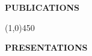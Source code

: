 \documentclass[9pt,letterpaper]{article}
\begin{document}
\newpage

\singlespacing

\noindent \textbf{PUBLICATIONS}
\begin{bibunit}[unsrt]
  \small
  \nocite{*}
  \putbib[citations]
\end{bibunit}

\begin{center}
  \line(1,0){450}
\end{center}

\noindent \textbf{PRESENTATIONS}
\begin{bibunit}[unsrt]
  \small
  \nocite{*}
  \putbib[citations2]
\end{bibunit}
\end{document}
